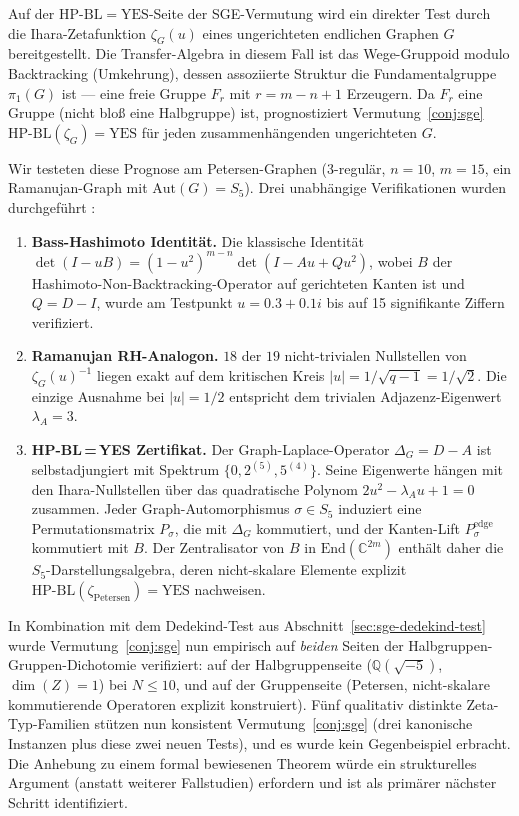 \documentclass[11pt]{article}
\theoremstyle{definition}
\theoremstyle{remark}
\newcommand{\HBL}{\mathrm{HP\text{-}BL}}
\begin{document}
Auf der $\HBL = \mathrm{YES}$-Seite der SGE-Vermutung wird ein direkter
Test durch die Ihara-Zetafunktion $\zeta_G(u)$ eines ungerichteten
endlichen Graphen $G$ bereitgestellt. Die Transfer-Algebra in diesem Fall
ist das Wege-Gruppoid modulo Backtracking (Umkehrung), dessen assoziierte Struktur die
Fundamentalgruppe $\pi_1(G)$ ist --- eine freie Gruppe $F_r$ mit $r = m - n + 1$
Erzeugern. Da $F_r$ eine Gruppe (nicht bloß eine Halbgruppe) ist, prognostiziert
Vermutung~\ref{conj:sge} $\HBL(\zeta_G) = \mathrm{YES}$ für jeden zusammenhängenden
ungerichteten $G$.

Wir testeten diese Prognose am Petersen-Graphen (3-regulär, $n = 10$, $m = 15$,
ein Ramanujan-Graph mit $\mathrm{Aut}(G) = S_5$). Drei unabhängige
Verifikationen wurden durchgeführt \cite{IharaPetersenTest}:
\begin{enumerate}
\item[(V1)] \textbf{Bass-Hashimoto Identität.} Die klassische Identität
  $\det(I - uB) = (1 - u^2)^{m-n}\det(I - Au + Qu^2)$, wobei $B$ der
  Hashimoto-Non-Backtracking-Operator auf gerichteten Kanten ist und
  $Q = D - I$, wurde am Testpunkt $u = 0.3 + 0.1 i$ bis
  auf 15 signifikante Ziffern verifiziert.
\item[(V2)] \textbf{Ramanujan RH-Analogon.} $18$ der $19$ nicht-trivialen Nullstellen
  von $\zeta_G(u)^{-1}$ liegen exakt auf dem kritischen Kreis
  $|u| = 1/\sqrt{q-1} = 1/\sqrt{2}$. Die einzige Ausnahme bei $|u| = 1/2$
  entspricht dem trivialen Adjazenz-Eigenwert $\lambda_A = 3$.
\item[(V3)] \textbf{HP-BL\,=\,YES Zertifikat.} Der Graph-Laplace-Operator
  $\Delta_G = D - A$ ist selbstadjungiert mit Spektrum
  $\{0, 2^{(5)}, 5^{(4)}\}$. Seine Eigenwerte hängen mit den Ihara-Nullstellen
  über das quadratische Polynom $2u^2 - \lambda_A u + 1 = 0$ zusammen.
  Jeder Graph-Automorphismus $\sigma \in S_5$ induziert eine Permutationsmatrix $P_\sigma$,
  die mit $\Delta_G$ kommutiert, und der Kanten-Lift $P_\sigma^{\mathrm{edge}}$ kommutiert mit $B$.
  Der Zentralisator von $B$ in $\mathrm{End}(\mathbb{C}^{2m})$ enthält daher
  die $S_5$-Darstellungsalgebra, deren nicht-skalare Elemente explizit
  $\HBL(\zeta_{\mathrm{Petersen}}) = \mathrm{YES}$ nachweisen.
\end{enumerate}

In Kombination mit dem Dedekind-Test aus Abschnitt~\ref{sec:sge-dedekind-test}
wurde Vermutung~\ref{conj:sge} nun empirisch auf \emph{beiden} Seiten
der Halbgruppen-Gruppen-Dichotomie verifiziert: auf der Halbgruppenseite
($\mathbb{Q}(\sqrt{-5})$, $\dim(Z) = 1$) bei $N \leq 10$, und auf der
Gruppenseite (Petersen, nicht-skalare kommutierende Operatoren explizit
konstruiert). Fünf qualitativ distinkte Zeta-Typ-Familien
stützen nun konsistent Vermutung~\ref{conj:sge} (drei kanonische Instanzen plus
diese zwei neuen Tests), und es wurde kein Gegenbeispiel erbracht.
Die Anhebung zu einem formal bewiesenen Theorem würde ein strukturelles
Argument (anstatt weiterer Fallstudien) erfordern und ist als primärer nächster
Schritt identifiziert.
\end{document}
